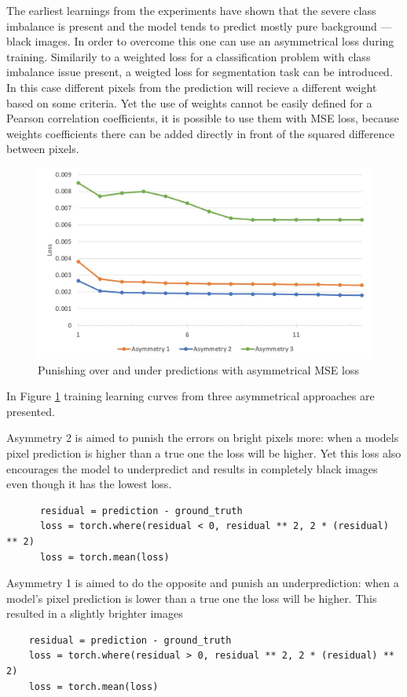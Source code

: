 The earliest learnings from the experiments have shown that the severe class imbalance is present and the model tends to predict mostly pure background --- black images. In order to overcome this one can use an asymmetrical loss during training. Similarily to a weighted loss for a classification problem with class imbalance issue present, a weigted loss for segmentation task can be introduced. In this case different pixels from the prediction will recieve a different weight based on some criteria. Yet the use of weights cannot be easily defined for a Pearson correlation coefficients, it is possible to use them with MSE loss, because weights coefficients there can be added directly in front of the squared difference between pixels.
\begin{figure}[H]
	\begin{center}
		\includegraphics[width=0.8\linewidth]{bilder/golgi/asymmetrical-training.jpg}
		\caption{Punishing over and under predictions with asymmetrical MSE loss}\label{fig:golgi-asymmetrical-training}
	\end{center}
\end{figure}

In Figure \ref{fig:golgi-asymmetrical-training} training learning curves from three asymmetrical approaches are presented.

Asymmetry 2 is aimed to punish the errors on bright pixels more: when a models pixel prediction is higher than a true one the loss will be higher. Yet this loss also encourages the model to underpredict and results in completely black images even though it has the lowest loss.
  \begin{lstlisting}
	  residual = prediction - ground_truth
	  loss = torch.where(residual < 0, residual ** 2, 2 * (residual) ** 2)
	  loss = torch.mean(loss)
	\end{lstlisting}

Asymmetry 1 is aimed to do the opposite and punish an underprediction: when a model's pixel prediction is lower than a true one the loss will be higher. This resulted in a slightly brighter images
\begin{lstlisting}
	residual = prediction - ground_truth
	loss = torch.where(residual > 0, residual ** 2, 2 * (residual) ** 2)
	loss = torch.mean(loss)
  \end{lstlisting}

